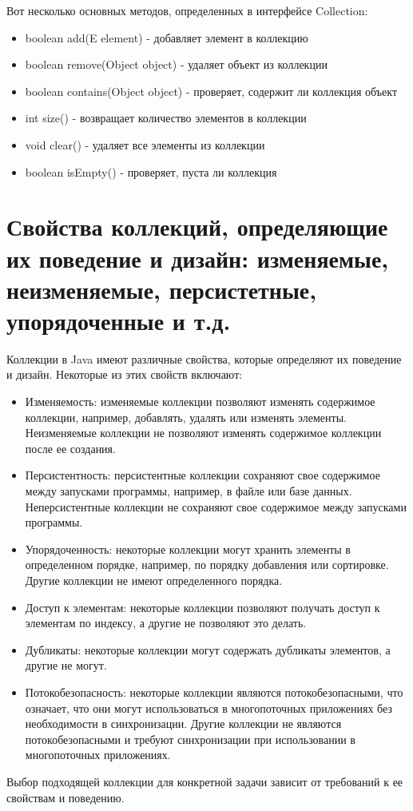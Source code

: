 Вот несколько основных методов, определенных в интерфейсе \newline
Collection:
    \begin{itemize}
    \item boolean add(E element) - добавляет элемент в коллекцию
    \item boolean remove(Object object) - удаляет объект из коллекции
    \item boolean contains(Object object) - проверяет, содержит ли коллекция объект
    \item int size() - возвращает количество элементов в коллекции
    \item void clear() - удаляет все элементы из коллекции
    \item boolean isEmpty() - проверяет, пуста ли коллекция
    \end{itemize}
\section{Свойства коллекций, определяющие их поведение и дизайн: изменяемые, неизменяемые, персистетные, упорядоченные и т.д.}
Коллекции в Java имеют различные свойства, которые определяют их поведение и дизайн. Некоторые из этих свойств включают:
    \begin{itemize}
   \item Изменяемость: изменяемые коллекции позволяют изменять содержимое коллекции, например, добавлять, удалять или изменять элементы. Неизменяемые коллекции не позволяют изменять содержимое коллекции после ее создания.

    \item Персистентность: персистентные коллекции сохраняют свое содержимое между запусками программы, например, в файле или базе данных. Неперсистентные коллекции не сохраняют свое содержимое между запусками программы.

    \item Упорядоченность: некоторые коллекции могут хранить элементы в определенном порядке, например, по порядку добавления или сортировке. Другие коллекции не имеют определенного порядка.

    \item Доступ к элементам: некоторые коллекции позволяют получать доступ к элементам по индексу, а другие не позволяют это делать.

    \item Дубликаты: некоторые коллекции могут содержать дубликаты элементов, а другие не могут.

    \item Потокобезопасность: некоторые коллекции являются потокобезопасными, что означает, что они могут использоваться в многопоточных приложениях без необходимости в синхронизации. Другие коллекции не являются потокобезопасными и требуют синхронизации при использовании в многопоточных приложениях.
    \end{itemize}
Выбор подходящей коллекции для конкретной задачи зависит от требований к ее свойствам и поведению.
